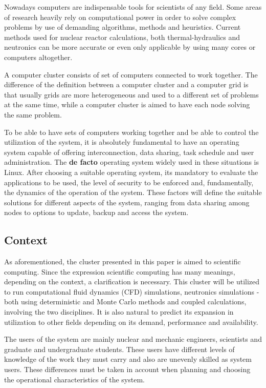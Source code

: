 \documentclass[twoside,a4paper,12pt,english]{inac17}
\begin{document}
Nowadays computers are indispensable tools for scientists of any field.
Some areas of research heavily rely on computational power in order to solve
complex problems by use of demanding algorithms, methods and heuristics.
Current methods used for nuclear reactor calculations, both thermal-hydraulics
and neutronics can be more accurate or even only applicable by using
many cores or computers altogether.

A computer cluster consists of set of computers connected to work together. The difference of the
definition between a computer cluster and a computer grid is that usually grids are more
heterogeneous and used to a different set of problems at the same time, while a computer
cluster is aimed to have each node solving the same problem.

To be able to have sets of computers working together and be able to control the utilization of the system,
it is absolutely fundamental to have an operating system capable of offering interconnection, data sharing,
task schedule and user administration. The \textbf{de facto} operating system widely used in these situations
is Linux\cite{linux}. After choosing a suitable operating system, its mandatory to evaluate the applications to
be used, the level of security to be enforced and, fundamentally, the dynamics of the operation of the system.
These factors will define the suitable solutions for different aspects of the system, ranging from data
sharing among nodes to options to update, backup and access the system.



\subsection{Context}

As aforementioned, the cluster presented in this paper is aimed to scientific computing.
Since the expression scientific computing has many meanings, depending on the context, a
clarification is necessary. This cluster will be utilized to run computational fluid dynamics
(CFD) simulations, neutronics simulations - both using deterministic and Monte Carlo methods
and coupled calculations, involving the two disciplines. It is also natural to predict
its expansion in utilization to other fields depending on its demand, performance and availability.

The users of the system are mainly nuclear and mechanic engineers, scientists and graduate
and undergraduate students. These users have different levels of knowledge of the work
they must carry and also are unevenly skilled as system users. These differences must be taken
in account when planning and choosing the operational characteristics of the system.
\end{document}
